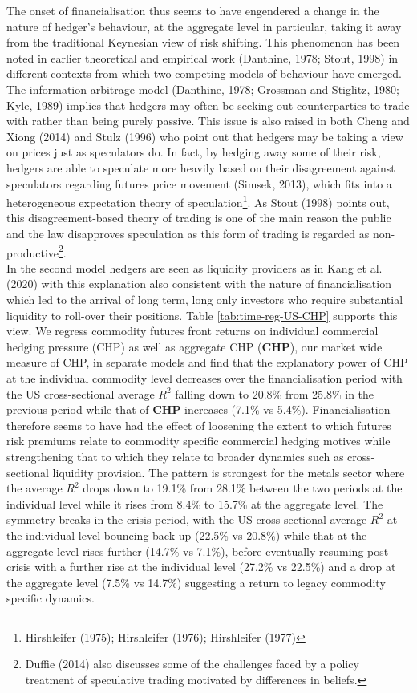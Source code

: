 \documentclass[]{elsarticle} %
\begin{document}
\medskip\setlength{\parindent}{0pt}

The onset of financialisation thus seems to have engendered a change in the nature of hedger's behaviour, at the aggregate level in particular, taking it away from the traditional Keynesian view of risk shifting. This phenomenon has been noted in earlier theoretical and empirical work (Danthine, 1978; Stout, 1998) in different contexts from which two competing models of behaviour have emerged.\\
The information arbitrage model (Danthine, 1978; Grossman and Stiglitz, 1980; Kyle, 1989) implies that hedgers may often be seeking out counterparties to trade with rather than being purely passive. This issue is also raised in both Cheng and Xiong (2014) and Stulz (1996) who point out that hedgers may be taking a view on prices just as speculators do. In fact, by hedging away some of their risk, hedgers are able to speculate more heavily based on their disagreement against speculators regarding futures price movement (Simsek, 2013), which fits into a heterogeneous expectation theory of speculation\footnote{Hirshleifer (1975); Hirshleifer (1976); Hirshleifer (1977)}. As Stout (1998) points out, this disagreement-based theory of trading is one of the main reason the public and the law disapproves speculation as this form of trading is regarded as non-productive\footnote{Duffie (2014) also discusses some of the challenges faced by a policy treatment of speculative trading motivated by differences in beliefs.}.\\
In the second model hedgers are seen as liquidity providers as in Kang et al. (2020) with this explanation also consistent with the nature of financialisation which led to the arrival of long term, long only investors who require substantial liquidity to roll-over their positions. Table \ref{tab:time-reg-US-CHP} supports this view. We regress commodity futures front returns on individual commercial hedging pressure (CHP) as well as aggregate CHP (\textbf{CHP}), our market wide measure of CHP, in separate models and find that the explanatory power of CHP at the individual commodity level decreases over the financialisation period with the US cross-sectional average \(R^{2}\) falling down to 20.8\% from 25.8\% in the previous period while that of \textbf{CHP} increases (7.1\% vs 5.4\%). Financialisation therefore seems to have had the effect of loosening the extent to which futures risk premiums relate to commodity specific commercial hedging motives while strengthening that to which they relate to broader dynamics such as cross-sectional liquidity provision. The pattern is strongest for the metals sector where the average \(R^{2}\) drops down to 19.1\% from 28.1\% between the two periods at the individual level while it rises from 8.4\% to 15.7\% at the aggregate level. The symmetry breaks in the crisis period, with the US cross-sectional average \(R^{2}\) at the individual level bouncing back up (22.5\% vs 20.8\%) while that at the aggregate level rises further (14.7\% vs 7.1\%), before eventually resuming post-crisis with a further rise at the individual level (27.2\% vs 22.5\%) and a drop at the aggregate level (7.5\% vs 14.7\%) suggesting a return to legacy commodity specific dynamics.
\end{document}
